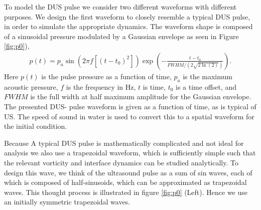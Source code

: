 To model the \ac{DUS} pulse we consider two different waveforms with
different purposes. We design the first waveform to closely resemble
a typical \ac{DUS} pulse, in order to simulate the appropriate dynamics.
The waveform shape is composed of a sinusoidal pressure modulated by a
Gaussian envelope as seen in Figure \ref{fig:p0}),
%
\begin{align} \label{eq:us_waveform}
p(t)=p_a \sin{\left( 2\pi f \left[ \left(t-t_0\right)^2\right]\right)}
\exp{\left(-\frac{t-t_0}{FWHM/\left(2\sqrt{2\ln{\left(2\right)}}\right)}\right)}.
\end{align}
%
Here $p(t)$ is the pulse pressure as a function of time, $p_a$ is the
maximum acoustic pressure, $f$ is the frequency in Hz, $t$ is time,
$t_0$ is a time offset, and $FWHM$ is the full width at half maximum
amplitude for the Gaussian envelope. The presented \ac{DUS}- pulse
waveform is given as a function of time, as is typical of \ac{US}. The
speed of sound in water is used to convert this to a spatial waveform
for the initial condition.

Because A typical \ac{DUS} pulse is mathematically complicated and not
ideal for analysis we also use a trapezoidal waveform, which is
sufficiently simple such that the relevant vorticity and interface
dynamics can be studied analytically. To design this wave, we think of
the ultrasound pulse as a sum of sin waves, each of which is composed
of half-sinusoids, which can be approximated as trapezoidal
waves. This thought process is illustrated in figure \ref{fig:p0}
(Left). Hence we use an initially symmetric trapezoidal waves.


